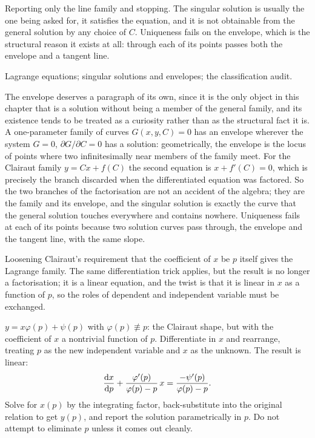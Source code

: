 \begin{trap}
Reporting only the line family and stopping. The singular solution is usually the one being asked for, it satisfies the equation, and it is not obtainable from the general solution by any choice of $C$. Uniqueness fails on the envelope, which is the structural reason it exists at all: through each of its points passes both the envelope and a tangent line.
\end{trap}

\begin{seealsob}Lagrange equations; singular solutions and envelopes; the classification audit.\end{seealsob}

The envelope deserves a paragraph of its own, since it is the only object in this chapter that is a solution without being a member of the general family, and its existence tends to be treated as a curiosity rather than as the structural fact it is. A one-parameter family of curves $G(x,y,C)=0$ has an envelope wherever the system $G=0$, $\partial G/\partial C=0$ has a solution: geometrically, the envelope is the locus of points where two infinitesimally near members of the family meet. For the Clairaut family $y=Cx+f(C)$ the second equation is $x+f'(C)=0$, which is precisely the branch discarded when the differentiated equation was factored. So the two branches of the factorisation are not an accident of the algebra; they are the family and its envelope, and the singular solution is exactly the curve that the general solution touches everywhere and contains nowhere. Uniqueness fails at each of its points because two solution curves pass through, the envelope and the tangent line, with the same slope.

Loosening Clairaut's requirement that the coefficient of $x$ be $p$ itself gives the Lagrange family. The same differentiation trick applies, but the result is no longer a factorisation; it is a linear equation, and the twist is that it is linear in $x$ as a function of $p$, so the roles of dependent and independent variable must be exchanged.

\cue $y=x\varphi(p)+\psi(p)$ with $\varphi(p)\not\equiv p$: the Clairaut shape, but with the coefficient of $x$ a nontrivial function of $p$.
\method Differentiate in $x$ and rearrange, treating $p$ as the new independent variable and $x$ as the unknown. The result is linear:
\[\frac{\mathrm{d}x}{\mathrm{d}p}+\frac{\varphi'(p)}{\varphi(p)-p}\,x=\frac{-\psi'(p)}{\varphi(p)-p}.\]
Solve for $x(p)$ by the integrating factor, back-substitute into the original relation to get $y(p)$, and report the solution parametrically in $p$. Do not attempt to eliminate $p$ unless it comes out cleanly.

